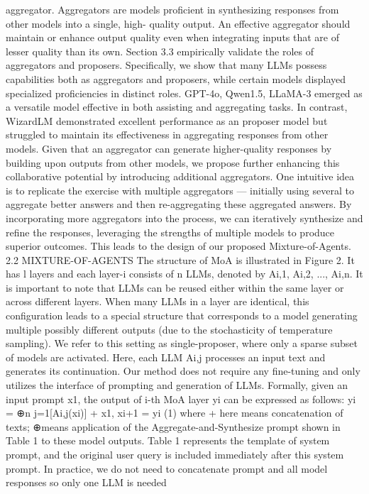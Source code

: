 aggregator.
Aggregators are models proficient in synthesizing responses from other models into a single, high-
quality output. An effective aggregator should maintain or enhance output quality even when
integrating inputs that are of lesser quality than its own.
Section 3.3 empirically validate the roles of aggregators and proposers. Specifically, we show that
many LLMs possess capabilities both as aggregators and proposers, while certain models displayed
specialized proficiencies in distinct roles. GPT-4o, Qwen1.5, LLaMA-3 emerged as a versatile model
effective in both assisting and aggregating tasks. In contrast, WizardLM demonstrated excellent
performance as an proposer model but struggled to maintain its effectiveness in aggregating responses
from other models.
Given that an aggregator can generate higher-quality responses by building upon outputs from
other models, we propose further enhancing this collaborative potential by introducing additional
aggregators. One intuitive idea is to replicate the exercise with multiple aggregators — initially
using several to aggregate better answers and then re-aggregating these aggregated answers. By
incorporating more aggregators into the process, we can iteratively synthesize and refine the responses,
leveraging the strengths of multiple models to produce superior outcomes. This leads to the design of
our proposed Mixture-of-Agents.
2.2
MIXTURE-OF-AGENTS
The structure of MoA is illustrated in Figure 2. It has l layers and each layer-i consists of n LLMs,
denoted by Ai,1, Ai,2, ..., Ai,n. It is important to note that LLMs can be reused either within the
same layer or across different layers. When many LLMs in a layer are identical, this configuration
leads to a special structure that corresponds to a model generating multiple possibly different outputs
(due to the stochasticity of temperature sampling). We refer to this setting as single-proposer, where
only a sparse subset of models are activated.
Here, each LLM Ai,j processes an input text and generates its continuation. Our method does not
require any fine-tuning and only utilizes the interface of prompting and generation of LLMs. Formally,
given an input prompt x1, the output of i-th MoA layer yi can be expressed as follows:
yi = ⊕n
j=1[Ai,j(xi)] + x1, xi+1 = yi
(1)
where + here means concatenation of texts; ⊕means application of the Aggregate-and-Synthesize
prompt shown in Table 1 to these model outputs. Table 1 represents the template of system prompt,
and the original user query is included immediately after this system prompt.
In practice, we do not need to concatenate prompt and all model responses so only one LLM is needed
